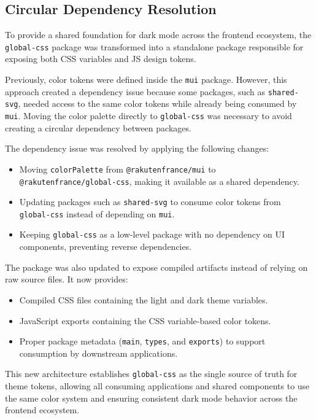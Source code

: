 \subsection{Circular Dependency Resolution}

To provide a shared foundation for dark mode across the frontend ecosystem, the \texttt{global-css} package was transformed into a standalone package responsible for exposing both CSS variables and \ac{JS} design tokens.

Previously, color tokens were defined inside the \lstinline|mui| package. However, this approach created a dependency issue because some packages, such as \lstinline|shared-svg|, needed access to the same color tokens while already being consumed by \lstinline|mui|. Moving the color palette directly to \lstinline|global-css| was necessary to avoid creating a circular dependency between packages.

The dependency issue was resolved by applying the following changes:

\begin{itemize}
    \item Moving \lstinline|colorPalette| from \lstinline|@rakutenfrance/mui| to \lstinline|@rakutenfrance/global-css|, making it available as a shared dependency.
    \item Updating packages such as \lstinline|shared-svg| to consume color tokens from \lstinline|global-css| instead of depending on \lstinline|mui|.
    \item Keeping \lstinline|global-css| as a low-level package with no dependency on UI components, preventing reverse dependencies.
\end{itemize}

The package was also updated to expose compiled artifacts instead of relying on raw source files. It now provides:

\begin{itemize}
    \item Compiled CSS files containing the light and dark theme variables.
    \item JavaScript exports containing the CSS variable-based color tokens.
    \item Proper package metadata (\lstinline|main|, \lstinline|types|, and \lstinline|exports|) to support consumption by downstream applications.
\end{itemize}

This new architecture establishes \lstinline|global-css| as the single source of truth for theme tokens, allowing all consuming applications and shared components to use the same color system and ensuring consistent dark mode behavior across the frontend ecosystem.

